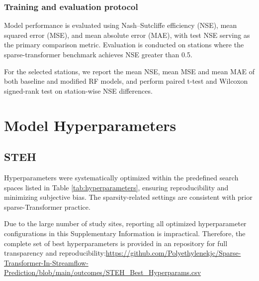 \documentclass[11pt]{article}
\begin{document}
\subsubsection*{Training and evaluation protocol}

Model performance is evaluated using Nash--Sutcliffe efficiency (NSE), mean squared error (MSE), and mean absolute error (MAE), with test NSE serving as the primary comparison metric\cite{Nse}. Evaluation is conducted on stations where the sparse-transformer benchmark achieves NSE greater than 0.5\cite{WRR_NSE}.

For the selected stations, we report the mean NSE, mean MSE and mean MAE of both baseline and modified RF models, and perform paired t-test and Wilcoxon signed-rank test on station-wise NSE differences.

\section{Model Hyperparameters}
\subsection{STEH}
\label{sec:STEHhyper}

Hyperparameters were systematically optimized within the predefined search spaces listed in Table \ref{tab:hyperparameters}\cite{BO_OPT}, ensuring reproducibility and minimizing subjective bias. The sparsity-related settings are consistent with prior sparse-Transformer practice\cite{openai_weight_sparse_transformers}.

Due to the large number of study sites, reporting all optimized hyperparameter configurations in this Supplementary Information is impractical. Therefore, the complete set of best hyperparameters is provided in an repository for full transparency and reproducibility:\href{https://github.com/Polyethylenekjc/Sparse-Transformer-In-Streamflow-Prediction/blob/main/outcomes/STEH\_Best\_Hyperparams.csv}{https://github.com/Polyethylenekjc/Sparse-Transformer-In-Streamflow-Prediction/blob/main/outcomes/STEH\_Best\_Hyperparams.csv}
\end{document}
